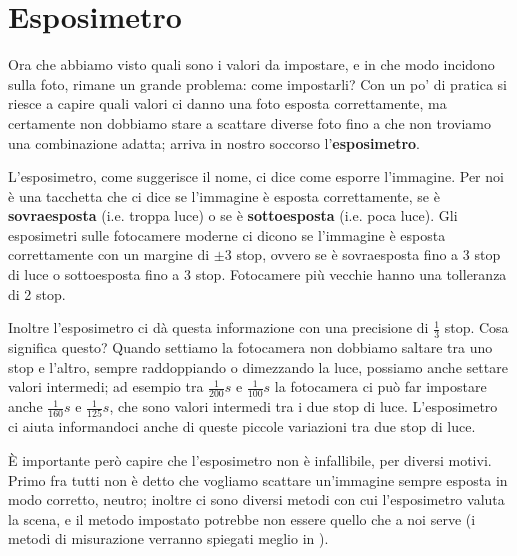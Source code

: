 \section{Esposimetro} \label{sec:esposimetro}
Ora che abbiamo visto quali sono i valori da impostare, e in che modo incidono sulla foto, rimane un grande problema: come impostarli?\newline
Con un po' di pratica si riesce a capire quali valori ci danno una foto esposta correttamente, ma certamente non dobbiamo stare a scattare diverse foto fino a che non troviamo una combinazione adatta; arriva in nostro soccorso l'\textbf{esposimetro}.

L'esposimetro, come suggerisce il nome, ci dice come esporre l'immagine. Per noi è una tacchetta che ci dice se l'immagine è esposta correttamente, se è \textbf{sovraesposta} (i.e. troppa luce) o se è \textbf{sottoesposta} (i.e. poca luce).\newline
Gli esposimetri sulle fotocamere moderne ci dicono se l'immagine è esposta correttamente con un margine di $\pm$3 stop, ovvero se è sovraesposta fino a 3 stop di luce o sottoesposta fino a 3 stop. Fotocamere più vecchie hanno una tolleranza di 2 stop.

Inoltre l'esposimetro ci dà questa informazione con una precisione di $\frac{1}{3}$ stop. Cosa significa questo? Quando settiamo la fotocamera non dobbiamo saltare tra uno stop e l'altro, sempre raddoppiando o dimezzando la luce, possiamo anche settare valori intermedi; ad esempio tra $\frac{1}{200}s$ e $\frac{1}{100}s$ la fotocamera ci può far impostare anche $\frac{1}{160}s$ e $\frac{1}{125}s$, che sono valori intermedi tra i due stop di luce.
L'esposimetro ci aiuta informandoci anche di queste piccole variazioni tra due stop di luce.

È importante però capire che l'esposimetro non è infallibile, per diversi motivi. Primo fra tutti non è detto che vogliamo scattare un'immagine sempre esposta in modo corretto, neutro; inoltre ci sono diversi metodi con cui l'esposimetro valuta la scena, e il metodo impostato potrebbe non essere quello che a noi serve (i metodi di misurazione verranno spiegati meglio in ).